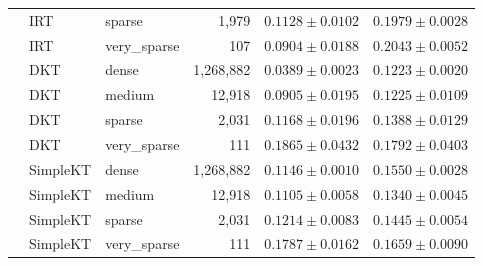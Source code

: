 \begin{table}[t]
{\begin{tabular}{lllrcc}
 & IRT & sparse & 1,979 & $0.1128 \pm 0.0102$ & $0.1979 \pm 0.0028$ \\
 & IRT & very\_sparse & 107 & $0.0904 \pm 0.0188$ & $0.2043 \pm 0.0052$ \\
 & DKT & dense & 1,268,882 & $0.0389 \pm 0.0023$ & $0.1223 \pm 0.0020$ \\
 & DKT & medium & 12,918 & $0.0905 \pm 0.0195$ & $0.1225 \pm 0.0109$ \\
 & DKT & sparse & 2,031 & $0.1168 \pm 0.0196$ & $0.1388 \pm 0.0129$ \\
 & DKT & very\_sparse & 111 & $0.1865 \pm 0.0432$ & $0.1792 \pm 0.0403$ \\
 & SimpleKT & dense & 1,268,882 & $0.1146 \pm 0.0010$ & $0.1550 \pm 0.0028$ \\
 & SimpleKT & medium & 12,918 & $0.1105 \pm 0.0058$ & $0.1340 \pm 0.0045$ \\
 & SimpleKT & sparse & 2,031 & $0.1214 \pm 0.0083$ & $0.1445 \pm 0.0054$ \\
 & SimpleKT & very\_sparse & 111 & $0.1787 \pm 0.0162$ & $0.1659 \pm 0.0090$ \\
\bottomrule
\end{tabular}
}
\end{table}
